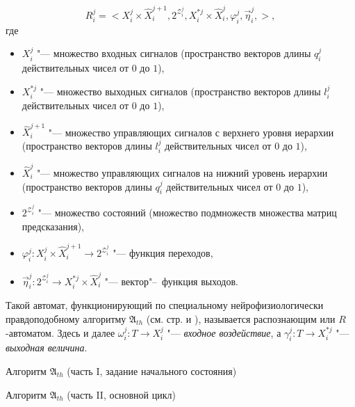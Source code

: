 \[
R_i^j=<X_i^j\times \hat{X}_i^{j+1}, 2^{\mathcal Z_i^j}, X_i^{*j}\times \hat{X}_i^j,\varphi_i^j,\vec\eta_i^j,>,
\]
где
\begin{itemize}
	\item $X_i^j$ "--- множество входных сигналов (пространство векторов длины $q_i^j$ действительных чисел от $0$ до $1$), 
	\item $X_i^{*j}$ "--- множество выходных сигналов (пространство векторов длины $l_i^j$ действительных чисел от $0$ до $1$), 
	\item $\hat{X}_i^{j+1}$ "--- множество управляющих сигналов с верхнего уровня иерархии (пространство векторов длины $l_i^j$ действительных чисел от $0$ до $1$),
	\item $\hat{X}_i^j$ "--- множество управляющих сигналов на нижний уровень иерархии (пространство векторов длины $q_i^j$ действительных чисел от $0$ до $1$),
	\item $2^{\mathcal Z_i^j}$ "--- множество состояний (множество подмножеств множества матриц предсказания),
	\item $\varphi_i^j:X_i^j\times \hat{X}_i^{j+1}\to 2^{\mathcal Z_i^j}$ "--- функция переходов,
	\item $\vec\eta_i^j:2^{\mathcal Z_i^j} \to X_i^{*j}\times \hat{X}_i^j$ "--- вектор"--~функция выходов.
\end{itemize}
Такой автомат, функционирующий по специальному нейрофизиологически правдоподобному алгоритму $\mathfrak A_{th}$ (см. стр. \pageref{alg:th_init} и \pageref{alg:th_cycle}), называется распознающим или $R$-автоматом. Здесь и далее $\omega_i^j:T{\to}X_i^j$ "--- \textit{входное воздействие}, а $\gamma_i^j:T{\to}X_i^{*j}$ "--- \textit{выходная величина}.

\begin{algorithm}[h]
	\caption{Алгоритм $\mathfrak{A}_{th}$ (часть I, задание начального состояния)}\label{alg:th_init}
	\begin{algorithmic}[1]
		
	\end{algorithmic}
\end{algorithm}

\begin{algorithm}[h]
	\caption{Алгоритм $\mathfrak{A}_{th}$ (часть II, основной цикл)}\label{alg:th_cycle}
	\begin{algorithmic}[1]
		\algrestore{algst:store1}
		
	\end{algorithmic}
\end{algorithm}


